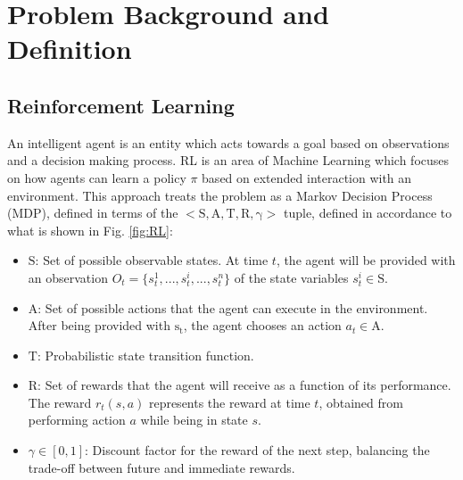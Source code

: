 \documentclass[conference]{IEEEtran}
\begin{document}
\section{Problem Background and Definition} \label{problem}
\subsection{Reinforcement Learning}
An intelligent agent is an entity which acts towards a goal based on observations and a decision making process. RL is an area of Machine Learning which focuses on how agents can learn a policy $\pi$ based on extended interaction with an environment.
This approach treats the problem as a Markov Decision Process (MDP), defined in terms of the  $\mathrm{<S, A, T, R, \gamma>}$ tuple, defined in accordance to what is shown in Fig. \ref{fig:RL}:
\begin{itemize}
    \item $\mathrm{S}$: Set of possible observable states. At time $t$, the agent will be provided with an observation $O_t=\{s^1_t, ..., s^i_t, ..., s^n_t\}$ of the state variables $s^i_t \in \mathrm{S}$.
    
    \item $\mathrm{A}$: Set of possible actions that the agent can execute in the environment. After being provided with $\mathrm{s_t}$, the agent chooses an action $a_t \in \mathrm{A}$.
    
    \item $\mathrm{T}$: Probabilistic state transition function.
    
    \item $\mathrm{R}$: Set of rewards that the agent will receive as a function of its performance. The reward $r_t(s,a)$ represents the reward at time $t$, obtained from performing action $a$ while being in state $s$.
    
    \item $\gamma \in [0,1]$: Discount factor for the reward of the next step, balancing the trade-off between future and immediate rewards.
\end{itemize}
\end{document}
